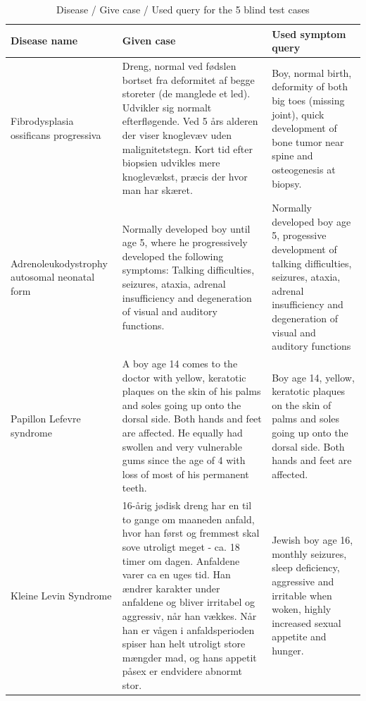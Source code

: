 \begin{table}[H]
\label{blind_test_table}
\caption{Disease / Give case / Used query for the 5 blind test cases}
\begin{scriptsize}
\label{OrphanetCases1}
\begin{tabular}{| p{3cm} | p{4.5cm} | p{4.5cm} |}
\hline
Disease name & Given case & Used symptom query \\
\hline
Fibrodysplasia ossificans progressiva & Dreng, normal ved f\o dslen bortset fra deformitet af begge storeter (de manglede et led). Udvikler sig normalt efterfl\o gende. Ved 5 \aa rs alderen der viser knoglev\ae v uden malignitetstegn. Kort tid efter biopsien udvikles mere knoglev\ae kst, pr\ae cis der hvor man har sk\ae ret. & Boy, normal birth, deformity of both big toes (missing joint), quick development of bone tumor near spine and osteogenesis at biopsy.\\
\hline
Adrenoleukodystrophy autosomal neonatal form & Normally developed boy until age 5, where he progressively developed the following symptoms: Talking difficulties, seizures, ataxia, adrenal insufficiency and  degeneration of visual and auditory functions.& Normally developed boy age 5, progessive development of talking difficulties, seizures, ataxia, adrenal insufficiency and  degeneration of visual and auditory functions \\
\hline
Papillon Lefevre syndrome & A boy age 14 comes to the doctor with yellow, keratotic plaques on the skin of his palms and soles going up onto the dorsal side. Both hands and feet are affected. He equally had swollen and very vulnerable gums since the age of 4 with loss of most of his permanent teeth. & Boy age 14, yellow, keratotic plaques on the skin of palms and soles going up onto the dorsal side. Both hands and feet are affected.\\
\hline
Kleine Levin Syndrome & 16-\aa rig j\o disk dreng har en til to gange om maaneden anfald, hvor han f\o rst og fremmest skal sove utroligt meget - ca. 18 timer om dagen. Anfaldene varer ca en uges tid. Han \ae ndrer karakter under anfaldene og bliver irritabel og aggressiv, n\aa r han v\ae kkes. N\aa r han er v\aa gen i anfaldsperioden spiser han helt utroligt store m\ae ngder mad, og hans appetit p\aa sex er endvidere abnormt stor. & Jewish boy age 16, monthly seizures, sleep deficiency, aggressive and irritable when woken, highly increased sexual appetite and hunger.\\
\hline

\end{tabular}
\end{scriptsize}
\end{table}
